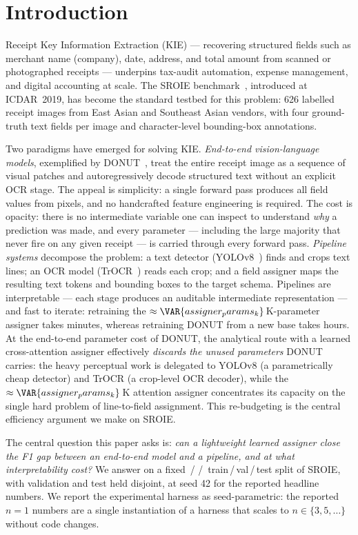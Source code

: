 \section{Introduction}

Receipt Key Information Extraction (KIE) --- recovering structured
fields such as merchant name (company), date, address, and total amount
from scanned or photographed receipts --- underpins tax-audit
automation, expense management, and digital accounting at scale.
The SROIE benchmark~\cite{huang2019icdar}, introduced at ICDAR~2019,
has become the standard testbed for this problem: 626 labelled receipt
images from East Asian and Southeast Asian vendors, with four
ground-truth text fields per image and character-level bounding-box
annotations.

Two paradigms have emerged for solving KIE.
\emph{End-to-end vision-language models}, exemplified by
DONUT~\cite{kim2022donut}, treat the entire receipt image as a sequence
of visual patches and autoregressively decode structured text without an
explicit OCR stage.  The appeal is simplicity: a single forward pass
produces all field values from pixels, and no handcrafted feature
engineering is required.  The cost is opacity: there is no intermediate
variable one can inspect to understand \emph{why} a prediction was made,
and every parameter --- including the large majority that never fire on
any given receipt --- is carried through every forward pass.
\emph{Pipeline systems} decompose the problem: a text detector
(YOLOv8~\cite{jocher2023yolov8}) finds and crops text lines;
an OCR model (TrOCR~\cite{li2023trocr}) reads each crop;
and a field assigner maps the resulting text tokens and bounding boxes
to the target schema.  Pipelines are interpretable --- each stage
produces an auditable intermediate representation --- and fast to
iterate: retraining the $\approx\VAR{assigner_params_k}\,$K-parameter
assigner takes minutes, whereas
retraining DONUT from a new base takes hours.
At  the end-to-end parameter cost of DONUT, the analytical
route with a learned cross-attention assigner effectively \emph{discards
the unused parameters} DONUT carries: the heavy perceptual work is
delegated to YOLOv8 (a parametrically cheap detector) and TrOCR (a
crop-level OCR decoder), while the $\approx\VAR{assigner_params_k}\,$K
attention assigner concentrates its capacity on the single hard problem
of line-to-field assignment.  This re-budgeting is the central
efficiency argument we make on SROIE.

The central question this paper asks is: \emph{can a lightweight
learned assigner close the F1 gap between an end-to-end model and a
pipeline, and at what interpretability cost?}  We answer on a fixed
\,/\,\,/\, train\,/\,val\,/\,test split of SROIE, with
validation and test held disjoint, at seed 42 for the reported
headline numbers.  We report the experimental harness as
seed-parametric: the reported $n{=}1$ numbers are a single
instantiation of a harness that scales to $n\in\{3,5,\ldots\}$
without code changes.

